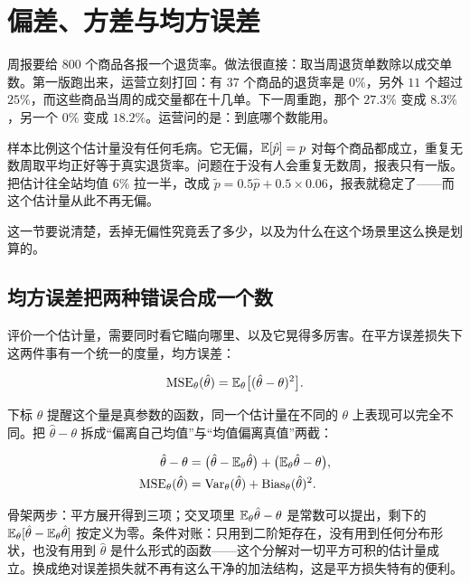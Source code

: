 \section{偏差、方差与均方误差}
\label{sec:11-Mathematical-Statistics/02-Point-Estimation/01}

周报要给 \(800\) 个商品各报一个退货率。做法很直接：取当周退货单数除以成交单数。第一版跑出来，运营立刻打回：有 \(37\) 个商品的退货率是 \(0\%\)，另外 \(11\) 个超过 \(25\%\)，而这些商品当周的成交量都在十几单。下一周重跑，那个 \(27.3\%\) 变成 \(8.3\%\)，另一个 \(0\%\) 变成 \(18.2\%\)。运营问的是：到底哪个数能用。

样本比例这个估计量没有任何毛病。它无偏，\(\mathbb{E}[\hat p]=p\) 对每个商品都成立，重复无数周取平均正好等于真实退货率。问题在于没有人会重复无数周，报表只有一版。把估计往全站均值 \(6\%\) 拉一半，改成 \(\tilde p=0.5\hat p+0.5\times 0.06\)，报表就稳定了——而这个估计量从此不再无偏。

这一节要说清楚，丢掉无偏性究竟丢了多少，以及为什么在这个场景里这么换是划算的。

\subsection{均方误差把两种错误合成一个数}

评价一个估计量，需要同时看它瞄向哪里、以及它晃得多厉害。在平方误差损失下这两件事有一个统一的度量，均方误差：

\[
\operatorname{MSE}_\theta(\hat\theta)=\mathbb{E}_\theta\bigl[(\hat\theta-\theta)^2\bigr].
\]

下标 \(\theta\) 提醒这个量是真参数的函数，同一个估计量在不同的 \(\theta\) 上表现可以完全不同。把 \(\hat\theta-\theta\) 拆成``偏离自己均值''与``均值偏离真值''两截：

\[
\begin{aligned}
\hat\theta-\theta&=\bigl(\hat\theta-\mathbb{E}_\theta\hat\theta\bigr)+\bigl(\mathbb{E}_\theta\hat\theta-\theta\bigr),\\
\operatorname{MSE}_\theta(\hat\theta)&=\operatorname{Var}_\theta(\hat\theta)+\operatorname{Bias}_\theta(\hat\theta)^2 .
\end{aligned}
\]

骨架两步：平方展开得到三项；交叉项里 \(\mathbb{E}_\theta\hat\theta-\theta\) 是常数可以提出，剩下的 \(\mathbb{E}_\theta[\hat\theta-\mathbb{E}_\theta\hat\theta]\) 按定义为零。条件对账：只用到二阶矩存在，没有用到任何分布形状，也没有用到 \(\hat\theta\) 是什么形式的函数——这个分解对一切平方可积的估计量成立。换成绝对误差损失就不再有这么干净的加法结构，这是平方损失特有的便利。

